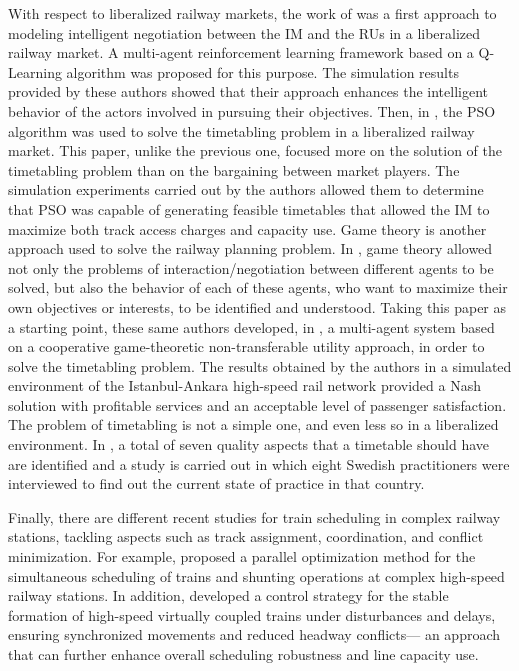 \documentclass[Afour,sagev,times]{sagej}
\begin{document}
With respect to liberalized railway markets, the work of \cite{Wong10} was a first approach to modeling intelligent negotiation between the \gls{IM} and the \glspl{RU} in a liberalized railway market. A multi-agent reinforcement learning framework based on a Q-Learning algorithm was proposed for this purpose. The simulation results provided by these authors showed that their approach enhances the intelligent behavior of the actors involved in pursuing their objectives. Then, in \cite{Ho12}, the \gls{PSO} algorithm was used to solve the timetabling problem in a liberalized railway market. This paper, unlike the previous one, focused more on the solution of the timetabling problem than on the bargaining between market players. The simulation experiments carried out by the authors allowed them to determine that \gls{PSO} was capable of generating feasible timetables that allowed the \gls{IM} to maximize both track access charges and capacity use. Game theory is another approach used to solve the railway planning problem. In \cite{Shakibaei19}, game theory allowed not only the problems of interaction/negotiation between different agents to be solved, but also the behavior of each of these agents, who want to maximize their own objectives or interests, to be identified and understood. Taking this paper as a starting point, these same authors developed, in \cite{Shakibaei21}, a multi-agent system based on a cooperative game-theoretic non-transferable utility approach, in order to solve the timetabling problem. The results obtained by the authors in a simulated environment of the Istanbul-Ankara high-speed rail network provided a Nash solution with profitable services and an acceptable level of passenger satisfaction. The problem of timetabling is not a simple one, and even less so in a liberalized environment. In \cite{Gestrelius20}, a total of seven quality aspects that a timetable should have are identified and a study is carried out in which eight Swedish practitioners were interviewed to find out the current state of practice in that country.

Finally, there are different recent studies for train scheduling in complex railway stations, tackling aspects such as track assignment, coordination, and conflict minimization. For example, \cite{Zhong24} proposed a parallel optimization method for the simultaneous scheduling of trains and shunting operations at complex high-speed railway stations. In addition, \cite{Liu23} developed a control strategy for the stable formation of high-speed virtually coupled trains under disturbances and delays, ensuring synchronized movements and reduced headway conflicts— an approach that can further enhance overall scheduling robustness and line capacity use.
\end{document}
